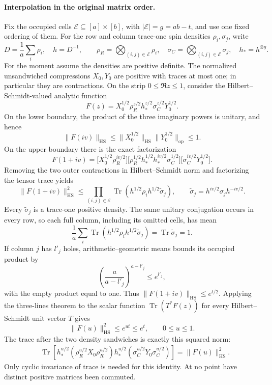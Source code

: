 \paragraph{Interpolation in the original matrix order.}
Fix the occupied cells $\mathcal E\subseteq[a]\times[b]$, with
$|\mathcal E|=g=ab-t$, and use one fixed ordering of them.  For the row
and column trace-one spin densities $\rho_i,\sigma_j$, write
\[
 D=\frac1a\sum_i\rho_i,\quad h=D^{-1},\qquad
 \rho_R=\bigotimes_{(i,j)\in\mathcal E}\rho_i,\quad
 \sigma_C=\bigotimes_{(i,j)\in\mathcal E}\sigma_j,\quad
 h_*=h^{\otimes g}.
\]
For the moment assume the densities are positive definite.  The normalized
unsandwiched compressions $X_0,Y_0$ are positive with traces at most one;
in particular they are contractions.  On the strip $0\le\Re z\le1$,
consider the Hilbert--Schmidt-valued analytic function
\[
 F(z)=X_0^{1/2}\rho_R^{z/2}h_*^{z/2}\sigma_C^{z/2}Y_0^{1/2}.
\]
On the lower boundary, the product of the three imaginary powers is
unitary, and hence
\[
 \|F(iv)\|_{\mathrm{HS}}
 \le\|X_0^{1/2}\|_{\mathrm{HS}}\|Y_0^{1/2}\|_{\mathrm{op}}\le1.
\]
On the upper boundary there is the exact factorization
\[
 F(1+iv)=
 \bigl[X_0^{1/2}\rho_R^{iv/2}\bigr]
 \bigl[\rho_R^{1/2}h_*^{1/2}h_*^{iv/2}\sigma_C^{1/2}\bigr]
 \bigl[\sigma_C^{iv/2}Y_0^{1/2}\bigr].
\]
Removing the two outer contractions in Hilbert--Schmidt norm and
factorizing the tensor trace yields
\[
 \|F(1+iv)\|_{\mathrm{HS}}^2
 \le\prod_{(i,j)\in\mathcal E}
 \operatorname{Tr}\!\left(h^{1/2}\rho_i h^{1/2}
                                  \widetilde\sigma_j\right),
 \qquad
 \widetilde\sigma_j=h^{iv/2}\sigma_jh^{-iv/2}.
\]
Every $\widetilde\sigma_j$ is a trace-one positive density.  The same
unitary conjugation occurs in every row, so each full column, including
its omitted cells, has mean
\[
 \frac1a\sum_i
 \operatorname{Tr}\!\left(h^{1/2}\rho_i h^{1/2}
                                  \widetilde\sigma_j\right)
 =\operatorname{Tr}\widetilde\sigma_j=1.
\]
If column $j$ has $l'_j$ holes, arithmetic--geometric means bounds its
occupied product by
\[
 \left(\frac{a}{a-l'_j}\right)^{a-l'_j}\le e^{l'_j},
\]
with the empty product equal to one.  Thus
$\|F(1+iv)\|_{\mathrm{HS}}\le e^{t/2}$.  Applying the three-lines
theorem to the scalar function $\operatorname{Tr}(T^*F(z))$ for every
Hilbert--Schmidt unit vector $T$ gives
\[
 \|F(u)\|_{\mathrm{HS}}^2\le e^{ut}\le e^t,
 \qquad 0\le u\le1.
\]
The trace after the two density sandwiches is exactly this squared norm:
\begin{align*}
 &\operatorname{Tr}\!\left[
 h_*^{u/2}(\rho_R^{u/2}X_0\rho_R^{u/2})h_*^{u/2}
            (\sigma_C^{u/2}Y_0\sigma_C^{u/2})\right]
   =\|F(u)\|_{\mathrm{HS}}^2.
\end{align*}
Only cyclic invariance of trace is needed for this identity.  At no point
have distinct positive matrices been commuted.

